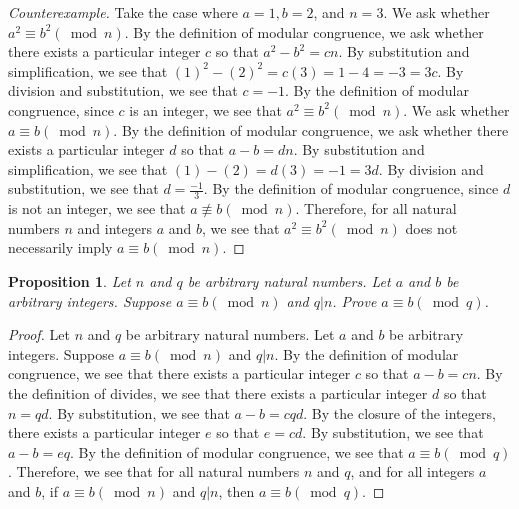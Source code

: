 \documentclass{amsart}
\newtheorem*{proposition}{Proposition}
\numberwithin{equation}{section}
\begin{document}
\begin{problem}[manual-num=54]
\begin{enumerate}
			\begin{proof}[Counterexample]
				Take the case where $a = 1, b = 2$, and $n = 3$.
				We ask whether $a^2 \equiv b^2 (\bmod n)$.
				By the definition of modular congruence, we ask whether there exists a particular integer $c$ so that $a^2 - b^2 = cn$.
				By substitution and simplification, we see that $(1)^2 - (2)^2 = c(3) = 1 - 4 = -3 = 3c$.
				By division and substitution, we see that $c = -1$.
				By the definition of modular congruence, since $c$ is an integer, we see that $a^2 \equiv b^2 (\bmod n)$.
				We ask whether $a \equiv b (\bmod n)$.
				By the definition of modular congruence, we ask whether there exists a particular integer $d$ so that $a - b = dn$.
				By substitution and simplification, we see that $(1) - (2) = d(3) = -1 = 3d$.
				By division and substitution, we see that $d = \frac{-1}{3}$.
				By the definition of modular congruence, since $d$ is not an integer, we see that $a \not \equiv b (\bmod n)$.
				Therefore, for all natural numbers $n$ and integers $a$ and $b$, we see that $a^2 \equiv b^2 (\bmod n)$ does not necessarily imply $a \equiv b (\bmod n)$.
			\end{proof}
		\end{enumerate}
	\end{problem}

	\newpage

	\begin{problem}[manual-num=55]
		\begin{proposition}
			Let $n$ and $q$ be arbitrary natural numbers.
			Let $a$ and $b$ be arbitrary integers.
			Suppose $a \equiv b (\bmod{n})$ and $q|n$.
			Prove $a \equiv b (\bmod{q})$.
		\end{proposition}

		\begin{proof}
			Let $n$ and $q$ be arbitrary natural numbers.
			Let $a$ and $b$ be arbitrary integers.
			Suppose $a \equiv b (\bmod{n})$ and $q | n$.
			By the definition of modular congruence, we see that there exists a particular integer $c$ so that $a - b = cn$.
			By the definition of divides, we see that there exists a particular integer $d$ so that $n = qd$.
			By substitution, we see that $a - b = cqd$.
			By the closure of the integers, there exists a particular integer $e$ so that $e = cd$.
			By substitution, we see that $a - b = eq$.
			By the definition of modular congruence, we see that $a \equiv b (\bmod{q})$.
			Therefore, we see that for all natural numbers $n$ and $q$, and for all integers $a$ and $b$, if $a \equiv b(\bmod{n})$ and $q|n$, then $a \equiv b (\bmod{q})$.
		\end{proof}
	\end{problem}
\end{document}

